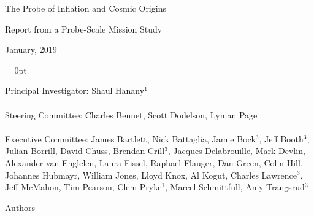 \documentclass[PICOReport.tex]{subfiles}
\begin{document}

\LARGE{ \centerline{The Probe of Inflation and Cosmic Origins}}
\vspace{0.1in}
\Large{ \centerline{Report from a Probe-Scale Mission Study}}
\Large{ \centerline{January, 2019 }}

\parindent = 0pt
\normalsize{Principal Investigator: Shaul Hanany$^1$ \\
\vspace{-7pt} \\
\normalsize{Steering Committee: Charles Bennet, Scott Dodelson, Lyman Page } \\
\vspace{-7pt} \\
\normalsize{Executive Committee: 
James Bartlett,
Nick Battaglia,
Jamie Bock$^3$, 
Jeff Booth$^3$,
Julian Borrill, 
David Chuss,
Brendan Crill$^3$, 
Jacques Delabrouille,
Mark Devlin, 
Alexander van Englelen,
Laura Fissel,
Raphael Flauger, 
Dan Green,
Colin Hill,
Johannes Hubmayr,
William Jones, 
Lloyd Knox, 
Al Kogut, 
Charles Lawrence$^3$, \\
Jeff McMahon, 
Tim Pearson,
Clem Pryke$^1$, 
Marcel Schmittfull,
Amy Trangsrud$^3$ 
}
\\


\label{authorlist}

\Large  {\centerline {Authors}}

\footnotesize {

}}
\end{document}
